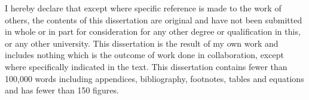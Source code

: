 
\begin{declaration}

I hereby declare that except where specific reference is made to the work of others, the contents of this dissertation are original and have not been submitted in whole or in part for consideration for any other degree or qualification in this, or any other university. This dissertation is the result of my own work and includes nothing which is the outcome of work done in collaboration, except where specifically indicated in the text. This dissertation contains fewer than 100,000 words including appendices, bibliography, footnotes, tables and equations and has fewer than 150 figures.


\end{declaration}

